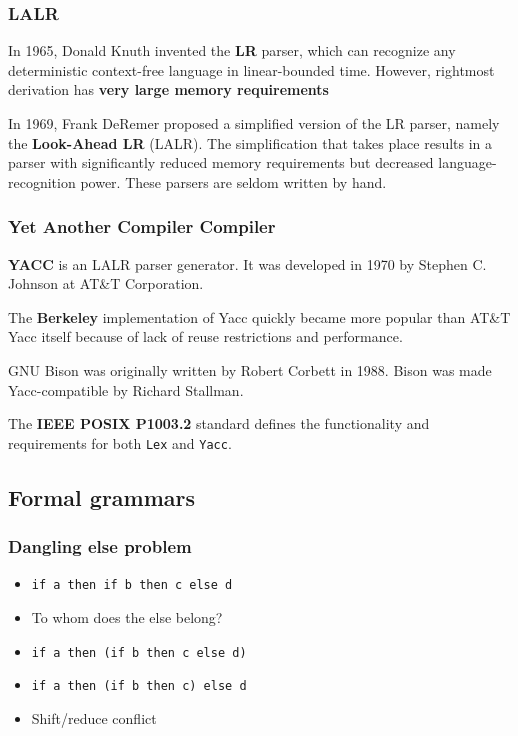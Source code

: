 \documentclass{beamer}
\begin{document}
\begin{frame}
  \frametitle{LALR}
  In 1965, Donald Knuth invented the \textbf{LR} parser, which can recognize any
  deterministic context-free language in linear-bounded time. However, rightmost
  derivation has \textbf{very large memory requirements}

  \vfill

  In 1969, Frank DeRemer proposed a simplified version of the LR parser, namely
  the \textbf{Look-Ahead LR} (LALR). The simplification that takes place results
  in a parser with significantly reduced memory requirements but decreased
  language-recognition power. These parsers are seldom written by hand.
\end{frame}

\begin{frame}
  \frametitle{Yet Another Compiler Compiler}
  \textbf{YACC} is an LALR parser generator. It was developed in 1970 by Stephen C.
  Johnson at AT\&T Corporation.

  \vfill

  The \textbf{Berkeley} implementation of Yacc quickly became more popular than
  AT\&T Yacc itself because of lack of reuse restrictions and performance.

  \vfill

  GNU Bison was originally written by Robert Corbett in 1988. Bison was made
  Yacc-compatible by Richard Stallman.

  \vfill

  The \textbf{IEEE POSIX P1003.2} standard defines the functionality and requirements for
  both \texttt{Lex} and \texttt{Yacc}.
\end{frame}

\subsection{Formal grammars}

\begin{frame}
  \frametitle{Dangling else problem}
    \begin{itemize}
      \item \texttt{if a then if b then c else d}
      \item To whom does the else belong?
      \item \texttt{if a then (if b then c else d)}
      \item \texttt{if a then (if b then c) else d}
      \item Shift/reduce conflict
    \end{itemize}
\end{frame}
\end{document}
